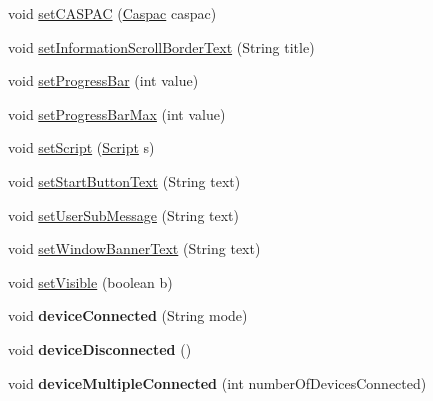 \begin{DoxyCompactItemize}
\item 
void \hyperlink{class_g_u_i_1_1_command_line_1_1_command_line_u_i_aaae27b90fd29fba729e521873df913f8}{set\-C\-A\-S\-P\-A\-C} (\hyperlink{class_c_a_s_u_a_l_1_1caspac_1_1_caspac}{Caspac} caspac)
\item 
void \hyperlink{class_g_u_i_1_1_command_line_1_1_command_line_u_i_a03fb5162205c2a77264a7f832893bf5a}{set\-Information\-Scroll\-Border\-Text} (String title)
\item 
void \hyperlink{class_g_u_i_1_1_command_line_1_1_command_line_u_i_a19458cd4aa884d53b240af6ecbd941e1}{set\-Progress\-Bar} (int value)
\item 
void \hyperlink{class_g_u_i_1_1_command_line_1_1_command_line_u_i_aa553b88f547b6fcd7f8219b4cd820671}{set\-Progress\-Bar\-Max} (int value)
\item 
void \hyperlink{class_g_u_i_1_1_command_line_1_1_command_line_u_i_a9efd7f6bbaa28fe492c54b8087dcd564}{set\-Script} (\hyperlink{class_c_a_s_u_a_l_1_1caspac_1_1_script}{Script} s)
\item 
void \hyperlink{class_g_u_i_1_1_command_line_1_1_command_line_u_i_aecda3d131532b1e5a1b6138861b4f28f}{set\-Start\-Button\-Text} (String text)
\item 
void \hyperlink{class_g_u_i_1_1_command_line_1_1_command_line_u_i_a9f14ae78f1863642bad3b30f56ba632c}{set\-User\-Sub\-Message} (String text)
\item 
void \hyperlink{class_g_u_i_1_1_command_line_1_1_command_line_u_i_a55610c1a8ffbdd00e303995534da215e}{set\-Window\-Banner\-Text} (String text)
\item 
void \hyperlink{class_g_u_i_1_1_command_line_1_1_command_line_u_i_ad55830582fea62a9137f6e9fc1ab3a61}{set\-Visible} (boolean b)
\item 
\hypertarget{class_g_u_i_1_1_command_line_1_1_command_line_u_i_a82f1e8ef2eb7d1ff58da48b54ecea07a}{void {\bfseries device\-Connected} (String mode)}\label{class_g_u_i_1_1_command_line_1_1_command_line_u_i_a82f1e8ef2eb7d1ff58da48b54ecea07a}

\item 
\hypertarget{class_g_u_i_1_1_command_line_1_1_command_line_u_i_a6ceb17c8a00f00e8b9da526b70757cbd}{void {\bfseries device\-Disconnected} ()}\label{class_g_u_i_1_1_command_line_1_1_command_line_u_i_a6ceb17c8a00f00e8b9da526b70757cbd}

\item 
\hypertarget{class_g_u_i_1_1_command_line_1_1_command_line_u_i_a12e8ed24f49127fd807a8feda2b42876}{void {\bfseries device\-Multiple\-Connected} (int number\-Of\-Devices\-Connected)}\label{class_g_u_i_1_1_command_line_1_1_command_line_u_i_a12e8ed24f49127fd807a8feda2b42876}


\end{DoxyCompactItemize}
